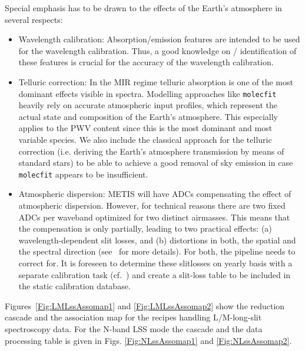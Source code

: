 Special emphasis has to be drawn to the effects of the Earth's atmosphere in several respects:
\begin{itemize}
\item Wavelength calibration: Absorption/emission features are intended to be
  used for the wavelength calibration. Thus, a good knowledge on /
  identification of these features is crucial for the accuracy of the
  wavelength calibration.
\item Telluric correction: In the MIR regime telluric absorption is one of the most dominant effects visible in
 spectra. Modelling approaches like \texttt{molecfit} heavily rely on accurate atmospheric input profiles, which represent the actual state and composition of the Earth's atmosphere. This especially applies to the \ac{PWV} content since this is the most dominant and most variable species. We also include the classical approach for the telluric correction (i.e. deriving the Earth's atmosphere transmission by means of standard stars) to be able to achieve a good removal of sky emission in case \texttt{molecfit} appears to be insufficient.
\item Atmospheric dispersion: \ac{METIS} will have \ac{ADC}s compensating the effect of atmospheric dispersion. However, for technical reasons there are two fixed ADCs per   waveband optimized for two distinct airmasses. This means that the compensation is only partially, leading to two practical effects:
  (a) wavelength-dependent slit losses, and (b) distortions in both,
  the spatial and the spectral direction (see~\cite{METIS-ADC_study}
  for more details). For both, the pipeline needs to correct
  for. It is foreseen to determine these slitlosses on yearly basis with a separate calibration task (cf.~\cite{METIS-calibration_plan}) and create a slit-loss table to be included in the static calibration database.
\end{itemize}


Figures~\ref{Fig:LMLssAssomap1} and \ref{Fig:LMLssAssomap2} show the reduction cascade and the association map for the recipes handling L/M-long-slit
spectroscopy data.  %
For the N-band \ac{LSS} mode the cascade and the data processing table is given in Figs. \ref{Fig:NLssAssomap1} and \ref{Fig:NLssAssomap2}.%

